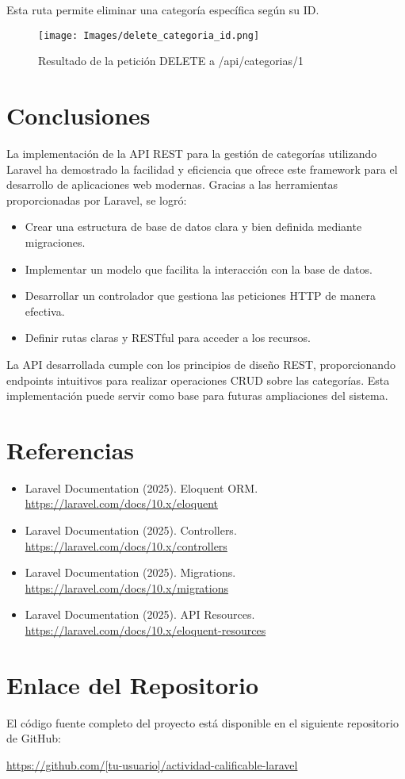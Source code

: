 \documentclass{article}
\begin{document}
Esta ruta permite eliminar una categoría específica según su ID.

\begin{figure}[h]
\centering
\texttt{[image: Images/delete\_categoria\_id.png]}
\caption{Resultado de la petición DELETE a /api/categorias/1}
\end{figure}

\section{Conclusiones}

La implementación de la API REST para la gestión de categorías utilizando Laravel ha demostrado la facilidad y eficiencia que ofrece este framework para el desarrollo de aplicaciones web modernas. Gracias a las herramientas proporcionadas por Laravel, se logró:

\begin{itemize}
  \item Crear una estructura de base de datos clara y bien definida mediante migraciones.
  \item Implementar un modelo que facilita la interacción con la base de datos.
  \item Desarrollar un controlador que gestiona las peticiones HTTP de manera efectiva.
  \item Definir rutas claras y RESTful para acceder a los recursos.
\end{itemize}

La API desarrollada cumple con los principios de diseño REST, proporcionando endpoints intuitivos para realizar operaciones CRUD sobre las categorías. Esta implementación puede servir como base para futuras ampliaciones del sistema.

\section{Referencias}

\begin{itemize}
  \item Laravel Documentation (2025). Eloquent ORM. \url{https://laravel.com/docs/10.x/eloquent}
  \item Laravel Documentation (2025). Controllers. \url{https://laravel.com/docs/10.x/controllers}
  \item Laravel Documentation (2025). Migrations. \url{https://laravel.com/docs/10.x/migrations}
  \item Laravel Documentation (2025). API Resources. \url{https://laravel.com/docs/10.x/eloquent-resources}
\end{itemize}

\section{Enlace del Repositorio}

El código fuente completo del proyecto está disponible en el siguiente repositorio de GitHub:

\url{https://github.com/[tu-usuario]/actividad-calificable-laravel}
\end{document}

